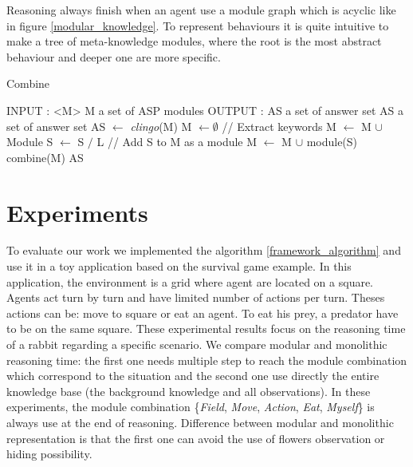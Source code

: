 \documentclass{aamas2012}
\begin{document}
	Reasoning always finish when an agent use a module graph which is acyclic like in figure \ref{modular_knowledge}.
	To represent behaviours it is quite intuitive to make a tree of meta-knowledge modules, 
	where the root is the most abstract behaviour and deeper one are more specific.

	\begin{algorithm}
	\caption{Combine}
	\label{framework_algorithm}
	\begin{algorithmic}[1]
	\STATE INPUT : <M> M a set of ASP modules
	\STATE OUTPUT : AS a set of answer set
	\newline
	\STATE AS a set of answer set
	\newline
	\STATE AS $\leftarrow$ \textit{clingo}(M)
	\newline
		\STATE M $\leftarrow \emptyset$ 
		\newline
		\STATE // Extract keywords
				\STATE M $\leftarrow$ M $\cup$ Module
				\STATE S $\leftarrow$ S $/$ L
			\ENDIF
		\ENDFOR
		\newline
			\STATE // Add S to M as a module
			\STATE M $\leftarrow$ M $\cup$ module(S)
			\STATE combine(M)
		\ENDIF
	\ENDFOR
	\newline
	\RETURN AS
	\end{algorithmic}
	\end{algorithm}

\section{Experiments}

	To evaluate our work we implemented the algorithm \ref{framework_algorithm} and use it in a toy application based on the survival game example.
	In this application, the environment is a grid where agent are located on a square.
	Agents act turn by turn and have limited number of actions per turn.
	Theses actions can be: move to square or eat an agent.
	To eat his prey, a predator have to be on the same square.
	These experimental results focus on the reasoning time of a rabbit regarding a specific scenario.
	We compare modular and monolithic reasoning time: the first one needs multiple step to reach the module combination
	which correspond to the situation and the second one use directly the entire knowledge base (the background knowledge and all observations).
	In these experiments, the module combination \{\emph{Field}, \emph{Move}, \emph{Action}, \emph{Eat}, \emph{Myself}\} is always use at the end of reasoning.
	Difference between modular and monolithic representation is that the first one can avoid the use of flowers observation or hiding possibility.
	
\end{document}
